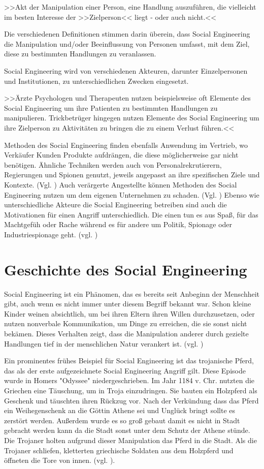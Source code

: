 >>Akt der Manipulation einer Person, eine Handlung auszuführen, die vielleicht im besten Interesse der >>Zielperson<< liegt - oder auch nicht.<<\cite{Hadn1}


Die verschiedenen Definitionen stimmen darin überein, dass Social Engineering die Manipulation und/oder Beeinflussung von Personen umfasst, mit dem Ziel, diese zu bestimmten Handlungen zu veranlassen.

Social Engineering wird von verschiedenen Akteuren, darunter Einzelpersonen und Institutionen, zu unterschiedlichen Zwecken eingesetzt.

>>Ärzte Psychologen und Therapeuten nutzen beispielsweise oft Elemente des Social Engineering um ihre Patienten zu bestimmten Handlungen zu manipulieren. Trickbetrüger hingegen nutzen Elemente des Social Engineering um ihre Zielperson zu Aktivitäten zu bringen die zu einem Verlust führen.<< \cite{Hadn1}

Methoden des Social Engineering finden ebenfalls Anwendung im Vertrieb, wo Verkäufer Kunden Produkte aufdrängen, die diese möglicherweise gar nicht benötigen. Ähnliche Techniken werden auch von Personalrekrutierern, Regierungen und Spionen genutzt, jeweils angepasst an ihre spezifischen Ziele und Kontexte. (Vgl. \cite{werSE})
Auch verärgerte Angestellte können Methoden des Social Engineering nutzen um dem eigenen Unternehmen zu schaden. (Vgl. \cite{Hadn2})
Ebenso wie unterschiedliche Akteure die Social Engineering betreiben sind auch die Motivationen für einen Angriff unterschiedlich. Die einen tun es aus Spaß, für das Machtgefüh oder Rache während es für andere um Politik, Spionage oder Industriespionage geht. (vgl. \cite{Motivation})

\section{Geschichte des Social Engineering}

Social Engineering ist ein Phänomen, das es bereits seit Anbeginn der Menschheit gibt, auch wenn es nicht immer unter diesem Begriff bekannt war. Schon kleine Kinder weinen absichtlich, um bei ihren Eltern ihren Willen durchzusetzen, oder nutzen nonverbale Kommunikation, um Dinge zu erreichen, die sie sonst nicht bekämen. Dieses Verhalten zeigt, dass die Manipulation anderer durch gezielte Handlungen tief in der menschlichen Natur verankert ist. (vgl. \cite{SEinNaturdesMenschverankert})

Ein prominentes frühes Beispiel für Social Engineering ist das trojanische Pferd, das als der erste aufgezeichnete Social Engineering Angriff gilt. Diese Episode wurde in Homers "Odyssee" niedergeschrieben. Im Jahr 1184 v. Chr. nutzten die Griechen eine Täuschung, um in Troja einzudringen. Sie bauten ein Holzpferd als Geschenk und täuschten ihren Rückzug vor. Nach der Verkündung dass das Pferd ein Weihegenschenk an die Göttin Athene sei und Unglück bringt sollte es zerstört werden. Außerdem wurde es so groß gebaut damit es nicht in Stadt gebracht werden kann da die Stadt sonst unter dem Schutz der Athene stünde. Die Trojaner holten aufgrund dieser Manipulation das Pferd in die Stadt. Als die Trojaner schliefen, kletterten griechische Soldaten aus dem Holzpferd und öffneten die Tore von innen. (vgl. \cite{troja}).

